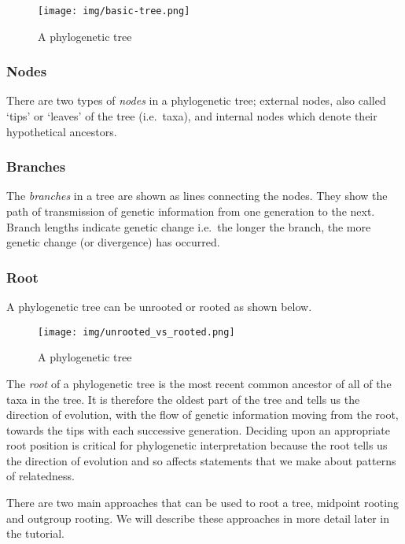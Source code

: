 \documentclass[11pt]{article}
\begin{document}
    \begin{figure}
\centering
\texttt{[image: img/basic-tree.png]}
\caption{A phylogenetic tree}
\end{figure}

    \hypertarget{nodes}{%
\subsubsection{Nodes}\label{nodes}}

There are two types of \textit{nodes} in a phylogenetic tree; external
nodes, also called `tips' or `leaves' of the tree (i.e.~taxa), and
internal nodes which denote their hypothetical ancestors.

\hypertarget{branches}{%
\subsubsection{Branches}\label{branches}}

The \textit{branches} in a tree are shown as lines connecting the nodes.
They show the path of transmission of genetic information from one
generation to the next. Branch lengths indicate genetic change i.e.~the
longer the branch, the more genetic change (or divergence) has occurred.

\hypertarget{root}{%
\subsubsection{Root}\label{root}}

A phylogenetic tree can be unrooted or rooted as shown below.

    \begin{figure}
\centering
\texttt{[image: img/unrooted\_vs\_rooted.png]}
\caption{A phylogenetic tree}
\end{figure}

    The \textit{root} of a phylogenetic tree is the most recent common
ancestor of all of the taxa in the tree. It is therefore the oldest part
of the tree and tells us the direction of evolution, with the flow of
genetic information moving from the root, towards the tips with each
successive generation. Deciding upon an appropriate root position is
critical for phylogenetic interpretation because the root tells us the
direction of evolution and so affects statements that we make about
patterns of relatedness.

There are two main approaches that can be used to root a tree, midpoint
rooting and outgroup rooting. We will describe these approaches in more
detail later in the tutorial.
\end{document}
